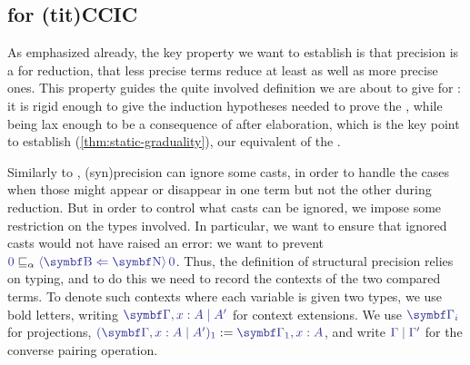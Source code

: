 \subsection{ for \kl(tit){CCIC}}

As emphasized already, the key property we want to establish is that precision
is a  for reduction,
\ie that less precise terms reduce at least as well as more precise ones.
This property guides the quite involved definition we are about to give for : it is rigid enough to give the induction hypotheses
needed to prove the , while being lax enough to be a consequence of
 after elaboration,
which is the key point to establish  (\cref{thm:static-graduality}),
our equivalent of the .

Similarly to , \kl(syn){precision} can ignore some casts,
in order to handle the cases when those might appear or disappear in one term but not the other
during reduction. But in order to control what
casts can be ignored, we impose some restriction on the types
involved. In particular, we want to ensure that ignored casts
would not have raised an error: \eg we want to prevent
$\tcol{0} \capre \tcol{\cast{\Nat}{\Bool}{0}}$.
Thus, the definition of structural precision relies on typing, and to do this we need to record the contexts of the two compared terms. To denote such contexts where each variable is given two types, we use bold letters, writing $\tcol{\GG , x : A \mid  A'}$ for context extensions. We use $\tcol{\GG_i}$ for projections, \ie $\tcol{\fs{(\GG, x : A \mid A')}} := \tcol{\fs{\GG}, x : A}$, and write $\tcol{\Gamma \mid \Gamma'}$ for the converse pairing operation.

